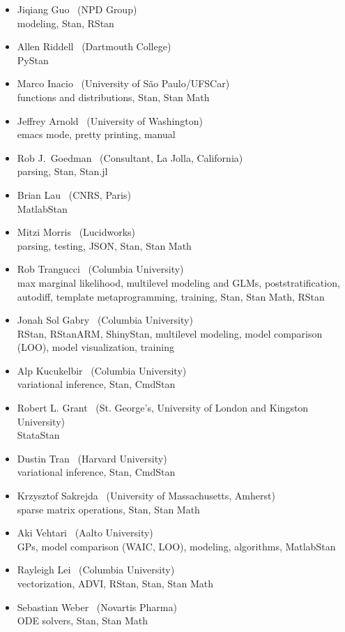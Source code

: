 \begin{itemize}
\\ {\footnotesize chief of optimization, code efficiency, matrix
  algebra, multivariate distributions, \Cpp, Stan, Stan Math, CmdStan}
\item Jiqiang Guo \   (NPD Group)
\\ {\footnotesize modeling, Stan, RStan}
\item Allen Riddell \   (Dartmouth College)
\\ {\footnotesize PyStan}
\item Marco Inacio \   (University of S\~{a}o Paulo/UFSCar)
\\ {\footnotesize functions and distributions, Stan, Stan Math}
\item Jeffrey Arnold \   (University of Washington)
\\ {\footnotesize emacs mode, pretty printing, manual}
\item Rob J.\ Goedman \ (Consultant, La Jolla, California)
\\ {\footnotesize parsing, Stan, Stan.jl}
\item Brian Lau \ (CNRS, Paris)
\\ {\footnotesize MatlabStan}
\item Mitzi Morris \   (Lucidworks)
\\ {\footnotesize parsing, testing, JSON, Stan, Stan Math}
\item Rob Trangucci \   (Columbia University)
\\ {\footnotesize max marginal likelihood, multilevel modeling and
  GLMs, poststratification, autodiff, template metaprogramming, 
  training, Stan, Stan Math, RStan}
\item Jonah Sol Gabry \ (Columbia University)
\\ {\footnotesize RStan, RStanARM, ShinyStan, multilevel modeling, 
  model comparison (LOO), model visualization, training}
\item Alp Kucukelbir \ (Columbia University)
\\ {\footnotesize variational inference, Stan, CmdStan}
\item Robert L. Grant \ (St. George's, University of London and
  Kingston University)
\\ {\footnotesize StataStan}
\item Dustin Tran \ (Harvard University)
\\ {\footnotesize variational inference, Stan, CmdStan}
\item Krzysztof Sakrejda \ (University of Massachusetts, Amherst)
\\ {\footnotesize sparse matrix operations, Stan, Stan Math}
\item Aki Vehtari \ (Aalto University)
\\ {\footnotesize GPs, model comparison (WAIC, LOO), modeling,
  algorithms, MatlabStan}
\item Rayleigh Lei \ (Columbia University)
\\ {\footnotesize vectorization, ADVI, RStan, Stan, Stan Math}
\item Sebastian Weber \ (Novartis Pharma)
\\ {\footnotesize ODE solvers, Stan, Stan Math}
\end{itemize}

